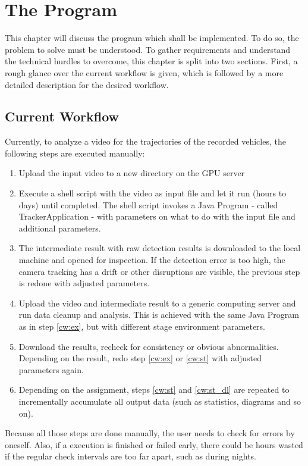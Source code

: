 \chapter{The Program}

This chapter will discuss the program which shall be implemented.
To do so, the problem to solve must be understood.
To gather requirements and understand the technical hurdles to overcome, this chapter is split into two sections.
First, a rough glance over the current workflow is given, which is followed by a more detailed description for the desired workflow.


\section{Current Workflow}

Currently, to analyze a video for the trajectories of the recorded vehicles, the following steps are executed manually:
\begin{enumerate}
	\item Upload the input video to a new directory on the GPU server
	\item \label{cw:ex} Execute a shell script with the video as input file and let it run (hours to days) until completed. The shell script invokes a Java Program - called TrackerApplication - with parameters on what to do with the input file and additional parameters.
	\item The intermediate result with raw detection results is downloaded to the local machine and opened for inspection. If the detection error is too high, the camera tracking has a drift or other disruptions are visible, the previous step is redone with adjusted parameters.
	\item \label{cw:st} Upload the video and intermediate result to a generic computing server and run data cleanup and analysis. This is achieved with the same Java Program as in step \ref{cw:ex}, but with different stage environment parameters.
	\item \label{cw:st_dl} Download the results, recheck for consistency or obvious abnormalities. Depending on the result, redo step \ref{cw:ex} or \ref{cw:st} with adjusted parameters again.
	\item Depending on the assignment, steps \ref{cw:st} and \ref{cw:st_dl} are repeated to incrementally accumulate all output data (such as statistics, diagrams and so on).
\end{enumerate}

Because all those steps are done manually, the user needs to check for errors by oneself.
Also, if a execution is finished or failed early, there could be hours wasted if the regular check intervals are too far apart, such as during nights.

